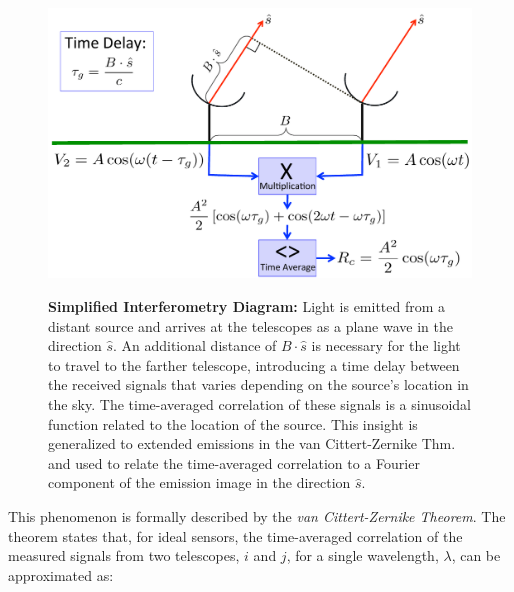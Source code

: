 \begin{figure}[tb!]
	\centering
	{\includegraphics[width=\linewidth]
		{interferometryfig.pdf}}
	\caption{ \footnotesize{{\bf Simplified Interferometry Diagram:} 
			Light is emitted from a distant source and arrives at the telescopes as a plane wave in the direction $\hat{s}$. An additional distance of $B \cdot \hat{s}$ is necessary for the light to travel to the farther telescope, introducing  a time delay between the received signals that varies depending on the source's location in the sky. The time-averaged correlation of these signals is a sinusoidal function related to the location of the source. This insight is generalized to extended emissions in the van Cittert-Zernike Thm. and used to relate the time-averaged correlation to a Fourier component of the emission image in the direction $\hat{s}$.
			\vspace{-.2in} }}
	\label{fig:introinterferometry}
\end{figure}


This phenomenon is formally described by the \textit{van Cittert-Zernike Theorem}. The theorem states that, for ideal sensors, the time-averaged correlation of the measured signals from two telescopes, $i$ and $j$, 
for a single wavelength, $\lambda$, can be approximated as:

